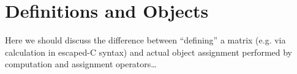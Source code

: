 \section{Definitions and Objects}
\label{sec:defobj}
Here we should discuss the difference between ``defining'' a matrix (e.g. via calculation in escaped-C syntax) and actual object assignment performed by computation and assignment operators\ldots

